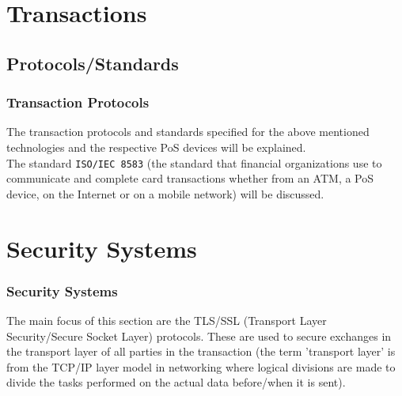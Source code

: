 \documentclass{beamer}
\begin{document}
	
	\section{Transactions}
	
	\subsection{Protocols/Standards}
	\begin{frame}
		\frametitle{Transaction Protocols}
		The transaction protocols and standards specified for the above mentioned technologies and the respective PoS devices will be explained.\\
		The standard \texttt{ISO/IEC 8583} (the standard that financial organizations
		use to communicate and complete card transactions whether from an ATM, a PoS device, on the Internet or on a mobile network) will be discussed.
	\end{frame}
	
	
	\section{Security Systems}
	
	\begin{frame}
		\frametitle{Security Systems}
		The main focus of this section are the TLS/SSL (Transport Layer Security/Secure Socket Layer) protocols. These are used to secure exchanges in the transport layer of all parties in the transaction (the term 'transport layer' is from the TCP/IP layer model in networking where logical divisions are made to divide the tasks performed on the actual data before/when it is sent).
	\end{frame}
	
	
	
	
\end{document}
